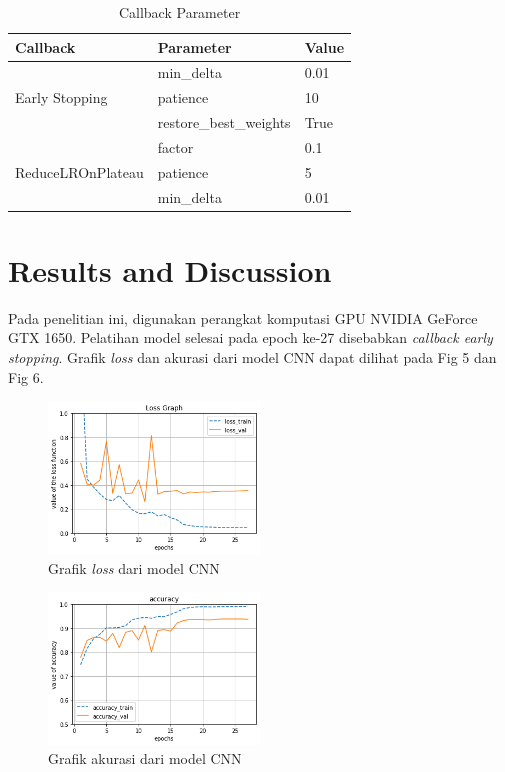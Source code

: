 \documentclass[conference]{IEEEtran}
\begin{document}
\begin{table}[htbp]
    \begin{center}
    \caption{Callback Parameter}
    \begin{tabular}{|l|l|l|}
    \hline
    \textbf{Callback} & \textbf{Parameter} & \textbf{Value} \\
    \hline
    \multirow{3}{*}{Early Stopping} & min\_delta & 0.01 \\ \cline{2-3} 
                                    & patience & 10 \\ \cline{2-3} 
                                    & restore\_best\_weights & True \\ \hline
    \multirow{3}{*}{ReduceLROnPlateau}  & factor & 0.1 \\ \cline{2-3} 
                                        & patience & 5 \\ \cline{2-3} 
                                        & min\_delta & 0.01 \\ \hline
    \end{tabular}
    \end{center}
    \end{table}

\section{Results and Discussion}
Pada penelitian ini, digunakan perangkat komputasi GPU NVIDIA GeForce GTX 1650. Pelatihan model selesai pada epoch ke-27 disebabkan \textit{callback early stopping}. Grafik \textit{loss} dan akurasi dari model CNN dapat dilihat pada Fig 5 dan Fig 6.

\begin{figure}[htbp]
    \centerline{\includegraphics[width=0.5\textwidth]{figures/loss.png}}
    \caption{Grafik \textit{loss} dari model CNN}
\end{figure}

\begin{figure}[htbp]
    \centerline{\includegraphics[width=0.5\textwidth]{figures/accuracy.png}}
    \caption{Grafik akurasi dari model CNN}
\end{figure}
\end{document}
